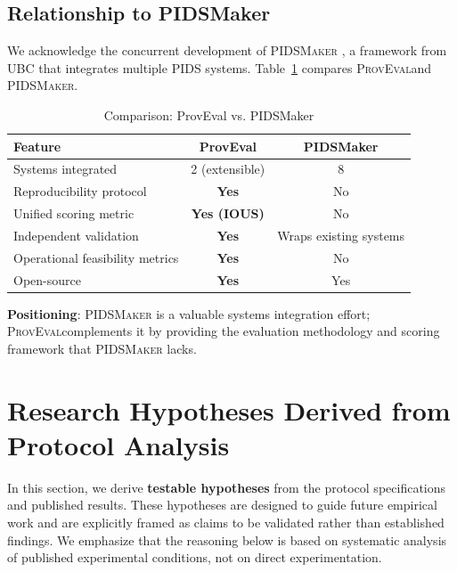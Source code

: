 \documentclass[11pt,a4paper]{article}
\newcommand{\system}[1]{\textsc{#1}}
\newcommand{\proveval}{\textsc{ProvEval}}
\begin{document}
\subsection{Relationship to PIDSMaker}

We acknowledge the concurrent development of \system{PIDSMaker} \cite{bilot2025pidsmaker}, a framework from UBC that integrates multiple PIDS systems. Table~\ref{tab:comparison-pidsmaker} compares \proveval and \system{PIDSMaker}.

\begin{table}[H]
\centering
\caption{Comparison: ProvEval vs. PIDSMaker}
\label{tab:comparison-pidsmaker}
\begin{tabular}{@{}lcc@{}}
\toprule
\textbf{Feature} & \textbf{ProvEval} & \textbf{PIDSMaker} \\
\midrule
Systems integrated & 2 (extensible) & 8 \\
Reproducibility protocol & \textbf{Yes} & No \\
Unified scoring metric & \textbf{Yes (IOUS)} & No \\
Independent validation & \textbf{Yes} & Wraps existing systems \\
Operational feasibility metrics & \textbf{Yes} & No \\
Open-source & \textbf{Yes} & Yes \\
\bottomrule
\end{tabular}
\end{table}

\textbf{Positioning}: \system{PIDSMaker} is a valuable systems integration effort; \proveval complements it by providing the evaluation methodology and scoring framework that \system{PIDSMaker} lacks.

\section{Research Hypotheses Derived from Protocol Analysis}
\label{sec:predictions}

In this section, we derive \textbf{testable hypotheses} from the protocol specifications and published results. These hypotheses are designed to guide future empirical work and are explicitly framed as claims to be validated rather than established findings. We emphasize that the reasoning below is based on systematic analysis of published experimental conditions, not on direct experimentation.
\end{document}
